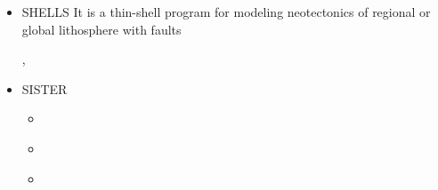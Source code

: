 \begin{itemize}
\begin{scriptsize}
\begin{itemize}
\item[\twothousandeleven]    \textcite{vahs11},  \textcite{java11},  \textcite{vayj11}
\item[\twothousandtwelve]    \textcite{beva12},  
                             \textcite{chgv12}, \textcite{vakn12}
\item[\twothousandthirteen]  \textcite{ancv13},  \textcite{cibi13},  \textcite{bova13}
\item[\twothousandfourteen]  \textcite{chsg14},  \textcite{mova14},  \textcite{chsv14}
\item[\twothousandfifteen]   \textcite{vasy15},  \textcite{cibi15},  \textcite{mori15}
\item[\twothousandseventeen] \textcite{civj17},  \textcite{wewv17}
\item[\twothousandeighteen]  \textcite{spcv18},  \textcite{chss18}
\item[\twothousandnineteen]  \textcite{zhdv19},  \textcite{vayu19},  \textcite{casv19}, 
                             \textcite{vaws19},  \textcite{cibi19}
\item[\twothousandtwenty]    \textcite{moku20},  \textcite{jomv20}
\item[\twothousandtwentyone] \textcite{pocv21},  \textcite{mota21}
\item[\twothousandtwentythree] \textcite{pocb23}
\end{itemize}
\end{scriptsize}

\item {\codefont SHELLS} 
It is a thin-shell program for modeling neotectonics of
regional or global lithosphere with faults

\begin{scriptsize}
\textcite{kobi95}, \textcite{nebs02}
\end{scriptsize}

\item {\codefont SISTER} 

\begin{scriptsize}
\begin{itemize}
\item[\twothousandsixteen]   \textcite{olbm16} 
\item[\twothousandeighteen]  \textcite{weib18}
\item[\twothousandtwentyone] \textcite{haao21}
\end{itemize}
\end{scriptsize}


\end{itemize}
